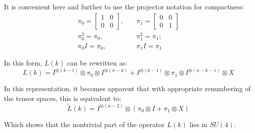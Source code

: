 \documentclass[a4paper, openany, 12pt]{article}
\theoremstyle{remark}
\theoremstyle{definition}
\newcommand{\ot}{\otimes}
\begin{document}
It is convenient here and further to use the projector notation for compactness:
\begin{align}
\pi_0 = \begin{bmatrix}
1&0\\
0&0
\end{bmatrix},&\quad \pi_1 = \begin{bmatrix}
0&0\\
0&1
\end{bmatrix}\\
\pi_0^2 = \pi_0,&\quad \pi_1^2 = \pi_1;\\
\pi_0I = \pi_0,&\quad \pi_1I = \pi_1
\end{align}

In this form, $L(k)$ can be rewritten as:
\begin{equation}
L(k) = I^{\ot (k-1)} \ot \pi_0\ot I^{\ot (n-k)} +
I^{\ot (k-1)} \ot\pi_1 \ot I^{\ot (n-k-1)}\ot X
\label{eq:l_k_throw_pi}
\end{equation}

In this representation, it becomes apparent that with appropriate renumbering of the tensor spaces, this is equivalent to:
\begin{equation}
\widetilde{L}(k) = I^{\ot (n-2)} \ot (\pi_0 \ot I + \pi_1 \ot X)
\end{equation}

Which shows that the nontrivial part of the operator $L(k)$ lies in $SU(4)$.
\end{document}
